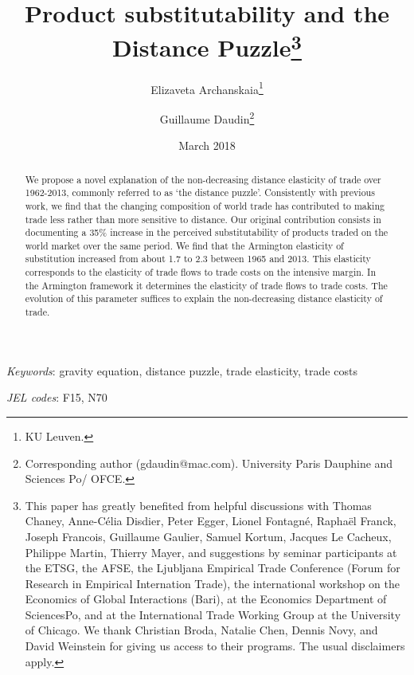 \documentclass[12pt,twoside,a4paper,notitlepage]{article}
\begin{document}
\linespread{1}
\author{Elizaveta Archanskaia\thanks{KU Leuven.}\and Guillaume Daudin\thanks{Corresponding author (gdaudin@mac.com). University Paris Dauphine and Sciences Po/ OFCE.}}

\title{Product substitutability and the Distance Puzzle\thanks{This paper has greatly benefited from helpful discussions with Thomas Chaney, Anne-C\'elia Disdier, Peter Egger, Lionel Fontagn\'e, Raphaël Franck, Joseph Francois, Guillaume Gaulier, Samuel Kortum, Jacques Le Cacheux, Philippe Martin, Thierry Mayer, and suggestions by seminar participants at the ETSG, the AFSE, the Ljubljana Empirical Trade Conference (Forum for Research in Empirical Internation Trade), the international workshop on the Economics of Global Interactions (Bari), at the Economics Department of SciencesPo, and at the International Trade Working Group at the University of Chicago. We thank Christian Broda, Natalie Chen, Dennis Novy, and David Weinstein for giving us access to their programs. The usual disclaimers apply.}}
\date{March 2018
\\
}

\maketitle
\begin{abstract}
We propose a novel explanation of the non-decreasing distance elasticity of trade over 1962-2013, commonly referred to as `the distance puzzle'. Consistently with previous work, we find that the changing composition of world trade has contributed to making trade less rather than more sensitive to distance.
Our original contribution consists in documenting a 35\% increase in the perceived substitutability of products traded on the world market over the same period. We find that the Armington elasticity of substitution increased from about 1.7 to 2.3 between 1965 and 2013. This elasticity corresponds to the elasticity of trade flows to trade costs on the intensive margin. In the Armington framework it determines the elasticity of trade flows to trade costs. The evolution of this parameter suffices to explain the non-decreasing distance elasticity of trade. 
\end{abstract}

\textit{Keywords}: gravity equation, distance puzzle, trade elasticity, trade costs

\textit{JEL codes}: F15, N70
\clearpage
\end{document}
